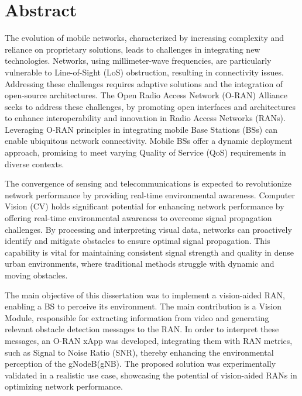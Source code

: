 
\chapter*{Abstract}
The evolution of mobile networks, characterized by increasing complexity and reliance on proprietary solutions, leads to challenges in integrating new technologies.
Networks, using millimeter-wave frequencies, are particularly vulnerable to Line-of-Sight (LoS) obstruction, resulting in connectivity issues.
Addressing these challenges requires adaptive solutions and the integration of open-source architectures.
The Open Radio Access Network (O-RAN) Alliance seeks to address these challenges, by promoting open interfaces and architectures to enhance interoperability and innovation in Radio Access Networks (RANs).
Leveraging O-RAN principles in integrating mobile Base Stations (BSs) can enable ubiquitous network connectivity.
Mobile BSs offer a dynamic deployment approach, promising to meet varying Quality of Service (QoS) requirements in diverse contexts.

The convergence of sensing and telecommunications is expected to revolutionize network performance by providing real-time environmental awareness.
Computer Vision (CV) holds significant potential for enhancing network performance by offering real-time environmental awareness to overcome signal propagation challenges.
By processing and interpreting visual data, networks can proactively identify and mitigate obstacles to ensure optimal signal propagation.
This capability is vital for maintaining consistent signal strength and quality in dense urban environments, where traditional methods struggle with dynamic and moving obstacles.

The main objective of this dissertation was to implement a vision-aided RAN, enabling a BS to perceive its environment.
The main contribution is a Vision Module, responsible for extracting information from video and generating relevant obstacle detection messages to the RAN\@.
In order to interpret these messages, an O-RAN xApp was developed, integrating them with RAN metrics, such as Signal to Noise Ratio (SNR), thereby enhancing the environmental perception of the gNodeB(gNB).
The proposed solution was experimentally validated in a realistic use case, showcasing the potential of vision-aided RANs in optimizing network performance.